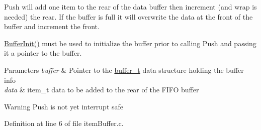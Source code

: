 Push will add one item to the rear of the data buffer then increment (and wrap is needed) the rear. If the buffer is full it will overwrite the data at the front of the buffer and increment the front.

\hyperlink{group__buffer_gaa5f81f606966455aa57a314ddd4e50d4}{Buffer\+Init()} must be used to initialize the buffer prior to calling Push and passing it a pointer to the buffer.


\begin{DoxyParams}{Parameters}
{\em buffer} & Pointer to the \hyperlink{structbuffer__t}{buffer\+\_\+t} data structure holding the buffer info \\
\hline
{\em data} & item\+\_\+t data to be added to the rear of the F\+I\+F\+O buffer\\
\hline
\end{DoxyParams}
\begin{DoxyWarning}{Warning}
Push is not yet interrupt safe 
\end{DoxyWarning}


Definition at line 6 of file item\+Buffer.\+c.

